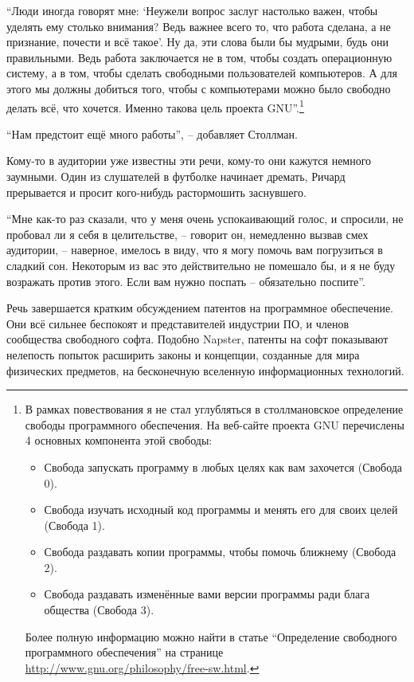 \enquote{Люди иногда говорят мне: \enquote{Неужели вопрос заслуг настолько важен, чтобы уделять ему столько внимания? Ведь важнее всего то, что работа сделана, а не признание, почести и всё такое}. Ну да, эти слова были бы мудрыми, будь они правильными. Ведь работа заключается не в том, чтобы создать операционную систему, а в том, чтобы сделать свободными пользователей компьютеров. А для этого мы должны добиться того, чтобы с компьютерами можно было свободно делать всё, что хочется. Именно такова цель проекта GNU}.\footnote{В рамках повествования я не стал углубляться в столлмановское определение свободы программного обеспечения. На веб-сайте проекта GNU перечислены 4 основных компонента этой свободы:

\begin{itemize}
  \item Свобода запускать программу в любых целях как вам захочется (Свобода 0).
  \item Свобода изучать исходный код программы и менять его для своих целей (Свобода 1).
  \item Свобода раздавать копии программы, чтобы помочь ближнему (Свобода 2).
  \item Свобода раздавать изменённые вами версии программы ради блага общества (Свобода 3).
\end{itemize}

Более полную информацию можно найти в статье \enquote{Определение свободного программного обеспечения} на странице \url{http://www.gnu.org/philosophy/free-sw.html}.}

\enquote{Нам предстоит ещё много работы}, -- добавляет Столлман.

Кому-то в аудитории уже известны эти речи, кому-то они кажутся немного заумными. Один из слушателей в футболке начинает дремать, Ричард прерывается и просит кого-нибудь растормошить заснувшего.

\enquote{Мне как-то раз сказали, что у меня очень успокаивающий голос, и спросили, не пробовал ли я себя в целительстве, -- говорит он, немедленно вызвав смех аудитории, -- наверное, имелось в виду, что я могу помочь вам погрузиться в сладкий сон. Некоторым из вас это действительно не помешало бы, и я не буду возражать против этого. Если вам нужно поспать -- обязательно поспите}.

Речь завершается кратким обсуждением патентов на программное обеспечение. Они всё сильнее беспокоят и представителей индустрии ПО, и членов сообщества свободного софта. Подобно Napster, патенты на софт показывают нелепость попыток расширить законы и концепции, созданные для мира физических предметов, на бесконечную вселенную информационных технологий.

